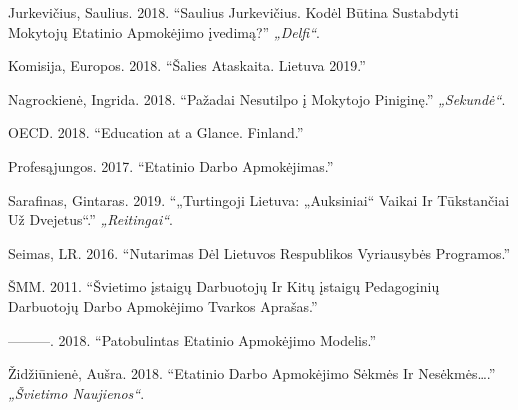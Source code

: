 \documentclass[]{article}
\begin{document}
\hypertarget{ref-sauliusjurkeviux10dius2018}{}
Jurkevičius, Saulius. 2018. ``Saulius Jurkevičius. Kodėl Būtina
Sustabdyti Mokytojų Etatinio Apmokėjimo įvedimą?'' \emph{„Delfi``}.

\hypertarget{ref-europoskomisija2018}{}
Komisija, Europos. 2018. ``Šalies Ataskaita. Lietuva 2019.''

\hypertarget{ref-ingridanagrockienux1172018}{}
Nagrockienė, Ingrida. 2018. ``Pažadai Nesutilpo į Mokytojo Piniginę.''
\emph{„Sekundė``}.

\hypertarget{ref-oecd2018}{}
OECD. 2018. ``Education at a Glance. Finland.''

\hypertarget{ref-profesux105jungos2017}{}
Profesąjungos. 2017. ``Etatinio Darbo Apmokėjimas.''

\hypertarget{ref-gintarassarafinas2019}{}
Sarafinas, Gintaras. 2019. ``„Turtingoji Lietuva: „Auksiniai`` Vaikai Ir
Tūkstančiai Už Dvejetus``.'' \emph{„Reitingai``}.

\hypertarget{ref-lrseimas2016}{}
Seimas, LR. 2016. ``Nutarimas Dėl Lietuvos Respublikos Vyriausybės
Programos.''

\hypertarget{ref-ux161mm2011}{}
ŠMM. 2011. ``Švietimo įstaigų Darbuotojų Ir Kitų įstaigų Pedagoginių
Darbuotojų Darbo Apmokėjimo Tvarkos Aprašas.''

\hypertarget{ref-ux161mm2018}{}
---------. 2018. ``Patobulintas Etatinio Apmokėjimo Modelis.''

\hypertarget{ref-auux161raux17eidux17eiux16bnienux1172018}{}
Židžiūnienė, Aušra. 2018. ``Etatinio Darbo Apmokėjimo Sėkmės Ir
Nesėkmės\ldots{}.'' \emph{„Švietimo Naujienos``}.
\end{document}
